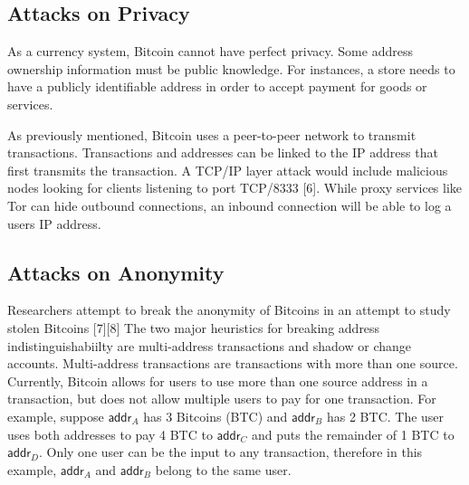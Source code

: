 
\subsection{Attacks on Privacy}
As a currency system, Bitcoin cannot have perfect privacy. Some address ownership information must be public knowledge. For instances, a store needs to have a publicly identifiable address in order to accept payment for goods or services.

As previously mentioned, Bitcoin uses a peer-to-peer network to transmit transactions. Transactions and addresses can be linked to the IP address that first transmits the transaction. A TCP/IP layer attack would include malicious nodes looking for clients listening to port TCP/8333 [6]. While proxy services like Tor can hide outbound connections, an inbound connection will be able to log a users IP address.

\subsection{Attacks on Anonymity}
Researchers attempt to break the anonymity of Bitcoins in an attempt to study stolen Bitcoins [7][8] 
The two major heuristics for breaking address indistinguishabiilty are multi-address transactions and shadow or change accounts.
Multi-address transactions are transactions with more than one source. Currently, Bitcoin allows for users to use more than one source address in a transaction, but does not allow multiple users to pay for one transaction. For example, suppose $\mathsf{addr}_A$ has 3 Bitcoins (BTC) and $\mathsf{addr}_B$ has 2 BTC. The user uses both addresses to pay 4 BTC to $\mathsf{addr}_C$ and puts the remainder of 1 BTC to $\mathsf{addr}_D$. Only one user can be the input to any transaction, therefore in this example, $\mathsf{addr}_A$ and $\mathsf{addr}_B$ belong to the same user.

